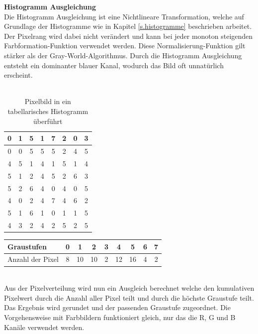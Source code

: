 \documentclass[a4paper,12pt,oneside]{article}
\begin{document}
  \textbf{Histogramm Ausgleichung}\label{s.ha}\\
  Die Histogramm Ausgleichung ist eine Nichtlineare Transformation, welche auf Grundlage der Histogramme wie in Kapitel \ref{s.histogramme} beschrieben arbeitet. Der Pixelrang wird dabei nicht verändert und kann bei jeder monoton steigenden Farbformation-Funktion verwendet werden. Diese Normalisierung-Funktion gilt stärker als der Gray-World-Algorithmus. Durch die Histogramm Ausgleichung entsteht ein dominanter blauer Kanal, wodurch das Bild oft unnatürlich erscheint.\\\\
   \begin{table}
  [h]
  \centering
  \caption{Pixelbild in ein tabellarisches Histogramm überführt}
  \begin{tabular}{|c|c|c|c|c|c|c|c|}
  \hline
  0&1&5&1&7&2&0&3\\
  \hline
  0&0&5&5&5&2&4&5\\
  \hline
  4&5&1&4&1&5&1&4\\
  \hline
  5&1&2&4&5&2&6&3\\
  \hline
  5&2&6&4&0&4&0&5\\
  \hline
  4&0&2&4&7&4&6&2\\
  \hline
  5&1&6&1&0&1&1&5\\
  \hline
  4&3&2&4&2&5&2&5\\
  \hline
  \end{tabular}
  \end{table}
  \begin{table}
  [h]
  \centering
  \begin{tabular}{|l|c|c|c|c|c|c|c|c|}
  \hline
  Graustufen & 0 & 1 & 2 & 3 & 4 & 5 & 6 & 7\\
  \hline
  Anzahl der Pixel & 8 & 10 & 10 & 2 & 12 & 16 & 4 & 2\\
  \hline
  \end{tabular}
  \end{table}\\
Aus der Pixelverteilung wird nun ein Ausgleich berechnet welche den kumulativen Pixelwert durch die Anzahl aller Pixel teilt und durch die höchste Graustufe teilt. Das Ergebnis wird gerundet und der passenden Graustufe zugeordnet. Die Vorgehensweise mit Farbbildern funktioniert gleich, nur das die R, G und B Kanäle verwendet werden.
\end{document}
